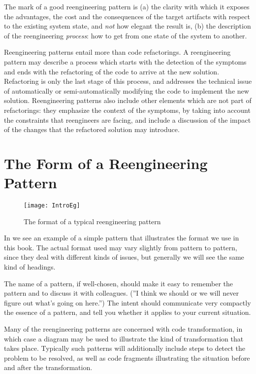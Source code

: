 \documentclass[a4paper,10pt,twoside]{book}
\begin{document}
The mark of a good reengineering pattern is (a) the clarity with which it exposes the advantages, the cost and the consequences of the target artifacts with respect to the existing system state, and \emph{not} how elegant the result is, (b) the description of the reengineering \emph{process}: how to get from one state of the system to another.

Reengineering patterns entail more than code refactorings. A reengineering pattern may describe a process which starts with the detection of the symptoms and ends with the refactoring of the code to arrive at the new solution. Refactoring is only the last stage of this process, and addresses the technical issue of automatically or semi-automatically modifying the code to implement the new solution. Reengineering patterns also include other elements which are not part of refactorings: they emphasize the context of the symptoms, by taking into account the constraints that reengineers are facing, and include a discussion of the impact of the changes that the refactored solution may introduce. 

\section{The Form of a Reengineering Pattern}

\begin{figure}
\begin{center}
\texttt{[image: IntroEg]}
\caption{The format of a typical reengineering pattern}
\end{center}
\end{figure}

In  we see an example of a simple pattern that illustrates the format we use in this book. The actual format used may vary slightly from pattern to pattern, since they deal with different kinds of issues, but generally we will see the same kind of headings.

The name of a pattern, if well-chosen, should make it easy to remember the pattern and to discuss it with colleagues. (''I think we should  or we will never figure out what's going on here.'') The intent should communicate very compactly the essence of a pattern, and tell you whether it applies to your current situation. 

Many of the reengineering patterns are concerned with code transformation, in which case a diagram may be used to illustrate the kind of transformation that takes place. Typically such patterns will additionally include steps to detect the problem to be resolved, as well as code fragments illustrating the situation before and after the transformation.
\end{document}
